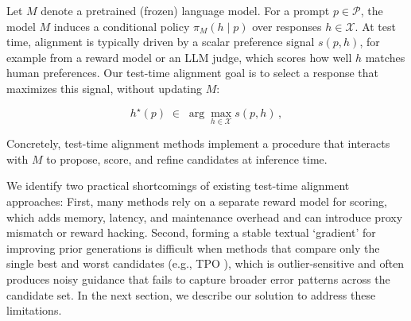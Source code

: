 \documentclass[11pt]{article}
\theoremstyle{plain}
\theoremstyle{definition}
\theoremstyle{remark}
\newcommand{\budget}{B}
\newcommand{\batchN}{N}
\begin{document}

Let \(M\) denote a pretrained (frozen) language model. For a prompt \(p\in\mathcal{P}\), the model \(M\) induces a conditional policy \(\pi_{M}(h\mid p)\) over responses \(h\in\mathcal{X}\). At test time, alignment is typically driven by a scalar preference signal \(s(p,h)\), for example from a reward model or an LLM judge, which scores how well \(h\) matches human preferences. Our test-time alignment goal is to select a response that maximizes this signal, without updating \(M\):

\begin{equation}
h^\star(p)\;\in\;\arg\max_{h\in\mathcal{X}} s(p,h)\,,
\end{equation}

Concretely, test-time alignment methods implement a procedure that interacts with \(M\) to propose, score, and refine candidates at inference time.


We identify two practical shortcomings of existing test-time alignment approaches: First, many methods rely on a separate reward model for scoring, which adds memory, latency, and maintenance overhead and can introduce proxy mismatch or reward hacking. Second, forming a stable textual `gradient' for improving prior generations is difficult when methods that compare only the single best and worst candidates (e.g., TPO \cite{litest}), which is outlier‑sensitive and often produces noisy guidance that fails to capture broader error patterns across the candidate set. In the next section, we describe our solution to address these limitations.
\end{document}
